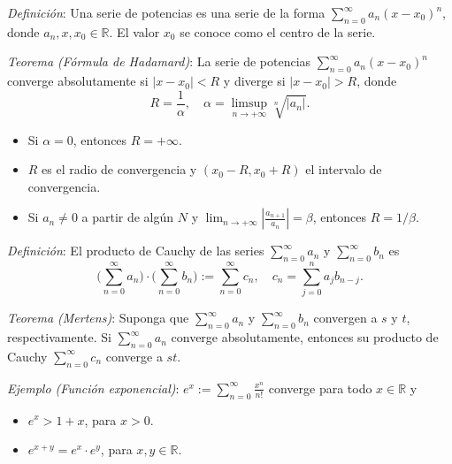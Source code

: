 \documentclass{beamer}
\begin{document}
  \begin{frame}
    \textit{Definición}: Una serie de potencias es una serie de la forma
    $\sum_{n=0}^{\infty} a_n (x - x_0)^n$, donde $a_n, x, x_0 \in \mathbb{R}$.
    El valor $x_0$ se conoce como el centro de la serie.
    \newline\newline
    \pause

    \textit{Teorema (Fórmula de Hadamard)}: La serie de potencias
    $\sum_{n=0}^{\infty} a_n (x - x_0)^n$ converge absolutamente si
    $|x - x_0| < R$ y diverge si $|x - x_0| > R$, donde
    \[
      R = \frac{1}{\alpha}, \quad \alpha = \limsup_{n \to +\infty} \sqrt[n]{|a_n|}.
    \]
    \pause
    \begin{itemize}[<+->]
      \item Si $\alpha = 0$, entonces $R = +\infty$.
      \item $R$ es el radio de convergencia y $(x_0 - R, x_0 + R)$ el intervalo
        de convergencia.
      \item Si $a_n \neq 0$ a partir de algún $N$ y
        $\lim_{n \to +\infty} \left| \frac{a_{n+1}}{a_n} \right| = \beta$, entonces
        $R = 1/\beta$.
    \end{itemize}
  \end{frame}

  \begin{frame}
    \textit{Definición}: El producto de Cauchy de las series
    $\sum_{n=0}^{\infty} a_n$ y $\sum_{n=0}^{\infty} b_n$ es
    \[
      \Big( \sum_{n=0}^{\infty} a_n \Big) \cdot \Big( \sum_{n=0}^{\infty} b_n \Big)
      := \sum_{n=0}^{\infty} c_n, \quad c_n = \sum_{j=0}^{n} a_j b_{n-j}.
    \]
    \pause

    \textit{Teorema (Mertens)}: Suponga que $\sum_{n=0}^{\infty} a_n$ y
    $\sum_{n=0}^{\infty} b_n$ convergen a $s$ y $t$, respectivamente. Si
    $\sum_{n=0}^{\infty} a_n$ converge absolutamente, entonces su producto de
    Cauchy $\sum_{n=0}^{\infty} c_n$ converge a $st$.
    \newline\newline
    \pause

    \textit{Ejemplo (Función exponencial)}:
    $e^x := \sum_{n=0}^{\infty} \frac{x^n}{n!}$ converge para todo $x \in \mathbb{R}$ y
    \begin{itemize}[<+->]
      \item $e^x > 1 + x$, para $x > 0$.
      \item $e^{x+y} = e^x \cdot e^y$, para $x, y \in \mathbb{R}$.
    \end{itemize}
  \end{frame}
\end{document}
